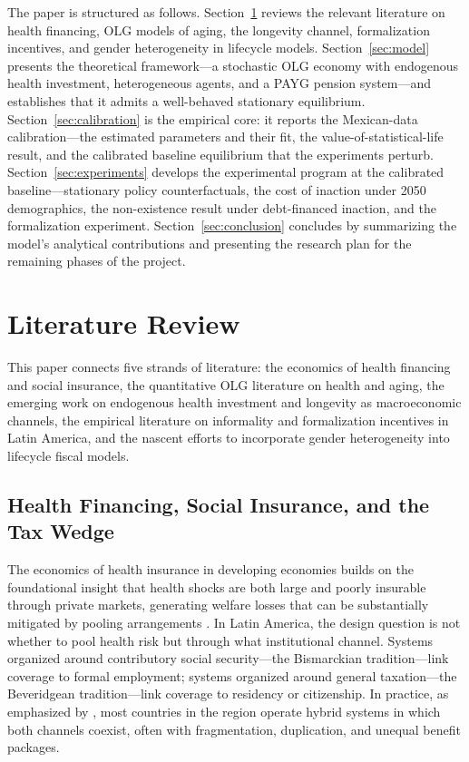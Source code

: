 \documentclass[12pt,a4paper]{article}
\begin{document}
The paper is structured as follows. Section~\ref{sec:lit} reviews the relevant literature on health financing, OLG models of aging, the longevity channel, formalization incentives, and gender heterogeneity in lifecycle models. Section~\ref{sec:model} presents the theoretical framework---a stochastic OLG economy with endogenous health investment, heterogeneous agents, and a PAYG pension system---and establishes that it admits a well-behaved stationary equilibrium. Section~\ref{sec:calibration} is the empirical core: it reports the Mexican-data calibration---the estimated parameters and their fit, the value-of-statistical-life result, and the calibrated baseline equilibrium that the experiments perturb. Section~\ref{sec:experiments} develops the experimental program at the calibrated baseline---stationary policy counterfactuals, the cost of inaction under 2050 demographics, the non-existence result under debt-financed inaction, and the formalization experiment. Section~\ref{sec:conclusion} concludes by summarizing the model's analytical contributions and presenting the research plan for the remaining phases of the project.

\section{Literature Review}
\label{sec:lit}

This paper connects five strands of literature: the economics of health financing and social insurance, the quantitative OLG literature on health and aging, the emerging work on endogenous health investment and longevity as macroeconomic channels, the empirical literature on informality and formalization incentives in Latin America, and the nascent efforts to incorporate gender heterogeneity into lifecycle fiscal models.

\subsection{Health Financing, Social Insurance, and the Tax Wedge}
\label{subsec:lit_health}

The economics of health insurance in developing economies builds on the foundational insight that health shocks are both large and poorly insurable through private markets, generating welfare losses that can be substantially mitigated by pooling arrangements \citep{Arrow1963}. In Latin America, the design question is not whether to pool health risk but through what institutional channel. Systems organized around contributory social security---the Bismarckian tradition---link coverage to formal employment; systems organized around general taxation---the Beveridgean tradition---link coverage to residency or citizenship. In practice, as emphasized by \citet{Levy2008}, most countries in the region operate hybrid systems in which both channels coexist, often with fragmentation, duplication, and unequal benefit packages.
\end{document}
